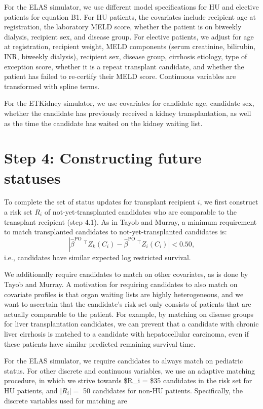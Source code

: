 \documentclass[11pt,twoside,]{book}
\begin{document}
For the ELAS simulator, we use different model specifications for HU
and elective patients for equation B1. For HU patients, the covariates
include recipient age at registration, the laboratory MELD score, whether the
patient is on biweekly dialysis, recipient sex, and disease group. For
elective patients, we adjust for age at registration, recipient weight,
MELD components (serum creatinine, bilirubin, INR, biweekly dialysis),
recipient sex, disease group, cirrhosis etiology, type of exception
score, whether it is a repeat transplant candidate, and whether the patient
has failed to re-certify their MELD score. Continuous variables are
transformed with spline terms.

For the ETKidney simulator, we use covariates for candidate age, candidate sex,
whether the candidate has previously received a kidney transplantation,
as well as the time the candidate has waited on the kidney waiting list.

\newpage

\section{Step 4: Constructing future statuses}\label{step-4-constructing-future-statuses}

To complete the set of status updates for transplant recipient \(i\),
we first construct a risk set \(R_i\) of not-yet-transplanted candidates who
are comparable to the transplant recipient (step 4.1).
As in Tayob and Murray, a minimum requirement to match transplanted
candidates to not-yet-transplanted candidates is:
\[|\hat{\beta}^{\text{PO}}\ ^\intercal Z_k(C_{i}) - \hat{\beta}^{\text{PO}}\ ^\intercal Z_i(C_{i})| < 0.50,\]
i.e., candidates have similar expected log restricted survival.

We additionally require candidates to match on other covariates,
as is done by Tayob and Murray. A motivation for requiring candidates to
also match on covariate profiles is that organ waiting lists are highly
heterogeneous, and we want to ascertain that the candidate's risk set
only consists of patients that are actually comparable to the patient. For example, by matching on disease groups for
liver transplantation candidates, we can prevent that a candidate
with chronic liver cirrhosis is matched to a candidate with hepatocellular
carcinoma, even if these patients have similar predicted remaining
survival time.

For the ELAS simulator, we require candidates to always match on pediatric status. For other discrete and continuous variables, we use an adaptive matching procedure,
in which we strive towards \$\textbar R\_i\textbar{} = \$35 candidates in the risk set for HU patients, and \(|R_i| =\) 50
candidates for non-HU patients. Specifically, the discrete variables used for matching are
\end{document}
